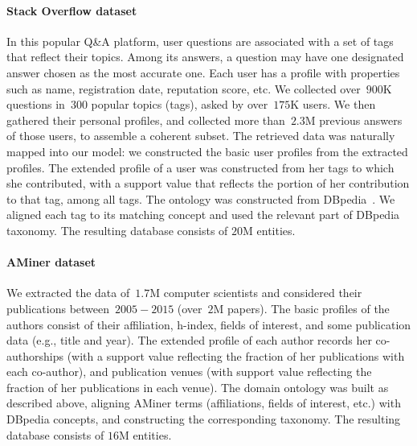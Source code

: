 \paragraph*{Stack Overflow dataset}
In this popular Q\&A platform, user questions are associated with a set of tags that reflect their topics.
Among its answers, a question may have one designated answer chosen
as the most accurate one. Each user has a 
profile with properties such as name, registration date, reputation score, etc. We collected over~$900$K questions in~$300$ popular topics (tags), asked
by over~$175$K users. We then gathered their
personal profiles, and collected more than~$2.3$M previous answers
of those users, to assemble a coherent subset. The retrieved data
was naturally mapped into our model: we constructed the basic user profiles from the extracted profiles. 
The extended profile
of a user was constructed from her tags to which she
contributed, with a support value that reflects the portion of her
contribution to that tag, among all tags. The ontology was constructed from DBpedia~\cite{dbpedia}. We aligned each
tag to its matching concept and used the relevant part of DBpedia taxonomy.  
The resulting database consists of $20$M entities.



\paragraph*{AMiner dataset}
We extracted the data of~$1.7$M computer scientists 
and considered their publications between~$2005 - 2015$ (over~$2$M papers). The basic profiles of the authors consist of their affiliation, h-index, fields of interest, and some publication data (e.g., title and year). The extended profile of each author records her
co-authorships (with a support value reflecting the fraction of her publications with each co-author), and publication venues (with support value reflecting the fraction of her publications in each venue). The domain ontology was built as
described above, aligning AMiner terms (affiliations, fields of
interest, etc.) with DBpedia concepts, and constructing the
corresponding taxonomy. The resulting database consists of $16$M entities.




